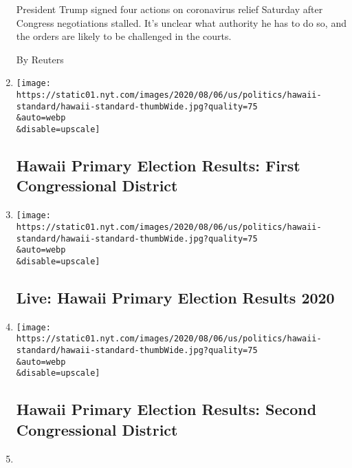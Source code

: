 \begin{enumerate}
  President Trump signed four actions on coronavirus relief Saturday
  after Congress negotiations stalled. It's unclear what authority he
  has to do so, and the orders are likely to be challenged in the
  courts.

  By Reuters
\item
  \href{/interactive/2020/08/08/us/elections/results-hawaii-house-district-1-primary-election.html}{}

  \texttt{[image: https://static01.nyt.com/images/2020/08/06/us/politics/hawaii-standard/hawaii-standard-thumbWide.jpg?quality=75\\\&auto=webp\\\&disable=upscale]}

  \hypertarget{hawaii-primary-election-results-first-congressional-district}{%
  \subsection{Hawaii Primary Election Results: First Congressional
  District}\label{hawaii-primary-election-results-first-congressional-district}}
\item
  \href{/interactive/2020/08/08/us/elections/results-hawaii-primary-elections.html}{}

  \texttt{[image: https://static01.nyt.com/images/2020/08/06/us/politics/hawaii-standard/hawaii-standard-thumbWide.jpg?quality=75\\\&auto=webp\\\&disable=upscale]}

  \hypertarget{live-hawaii-primary-election-results-2020}{%
  \subsection{Live: Hawaii Primary Election Results
  2020}\label{live-hawaii-primary-election-results-2020}}
\item
  \href{/interactive/2020/08/08/us/elections/results-hawaii-house-district-2-primary-election.html}{}

  \texttt{[image: https://static01.nyt.com/images/2020/08/06/us/politics/hawaii-standard/hawaii-standard-thumbWide.jpg?quality=75\\\&auto=webp\\\&disable=upscale]}

  \hypertarget{hawaii-primary-election-results-second-congressional-district}{%
  \subsection{Hawaii Primary Election Results: Second Congressional
  District}\label{hawaii-primary-election-results-second-congressional-district}}
\item
  \href{/2020/08/08/books/rick-gates-trump-mueller-wicked-game.html}{}


\end{enumerate}
